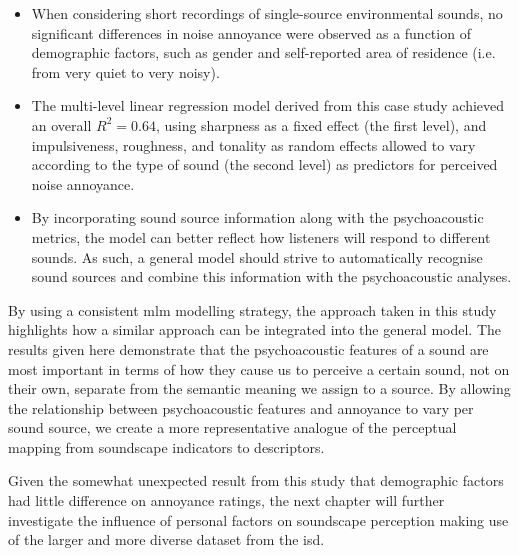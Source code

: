 \begin{itemize}
  \item When considering short recordings of single-source environmental sounds, no significant differences in noise annoyance were observed as a function of demographic factors, such as gender and self-reported area of residence (i.e. from very quiet to very noisy).
  \item The multi-level linear regression model derived from this case study achieved an overall $R^2=0.64$, using sharpness as a fixed effect (the first level), and impulsiveness, roughness, and tonality as random effects allowed to vary according to the type of sound (the second level) as predictors for perceived noise annoyance.
  \item By incorporating sound source information along with the psychoacoustic metrics, the model can better reflect how listeners will respond to different sounds. As such, a general model should strive to automatically recognise sound sources and combine this information with the psychoacoustic analyses.
\end{itemize}

By using a consistent \gls{mlm} modelling strategy, the approach taken in this study highlights how a similar approach can be integrated into the general model. The results given here demonstrate that the psychoacoustic features of a sound are most important in terms of how they cause us to perceive a certain sound, not on their own, separate from the semantic meaning we assign to a source. By allowing the relationship between psychoacoustic features and annoyance to vary per sound source, we create a more representative analogue of the perceptual mapping from soundscape indicators to descriptors. 

Given the somewhat unexpected result from this study that demographic factors had little difference on annoyance ratings, the next chapter will further investigate the influence of personal factors on soundscape perception making use of the larger and more diverse dataset from the \gls{isd}.
